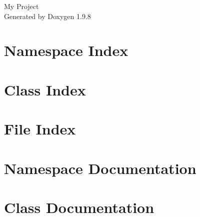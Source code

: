 \documentclass[twoside]{book}
\newcommand{\+}{\discretionary{\mbox{\scriptsize$\hookleftarrow$}}{}{}}
\newcommand{\clearemptydoublepage}{%
    \newpage{\pagestyle{empty}\cleardoublepage}%
  }
\begin{document}
  \raggedbottom
    \hypersetup{pageanchor=false,
                bookmarksnumbered=true,
                pdfencoding=unicode
               }
  \begin{titlepage}
  \vspace*{7cm}
  \begin{center}%
  {\Large My Project}\\
  \vspace*{1cm}
  {\large Generated by Doxygen 1.9.8}\\
  \end{center}
  \end{titlepage}
  \clearemptydoublepage
  \tableofcontents
  \clearemptydoublepage
  \hypersetup{pageanchor=true}
\chapter{Namespace Index}

\chapter{Class Index}

\chapter{File Index}

\chapter{Namespace Documentation}



\chapter{Class Documentation}







\end{document}
